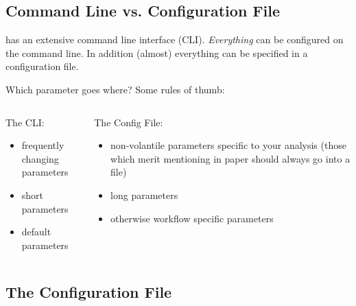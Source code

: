 \subsection{Command Line vs. Configuration File}

\begin{frame}
  \begin{docs}
  	\Snakemake{} has an extensive command line interface (CLI). \emph{Everything} can be configured on the command line. In addition (almost) everything can be specified in a configuration file.
  \end{docs}
  \pause
  \begin{exampleblock}{Which parameter goes where? Some rules of thumb:}
    \begin{columns}[t]
      \begin{column}{0.5\textwidth}
        The CLI:
        \begin{itemize}
         \item frequently changing parameters
         \item short parameters
         \item default parameters
        \end{itemize}
      \end{column}
      \begin{column}{0.5\textwidth}
        The Config File:
        \begin{itemize}
         \item non-volantile parameters specific to your analysis (those which merit mentioning in paper should always go into a file)
         \item long parameters
         \item otherwise workflow specific parameters
        \end{itemize}
      \end{column}
    \end{columns}
  \end{exampleblock}
\end{frame}

\subsection{The Configuration File}


